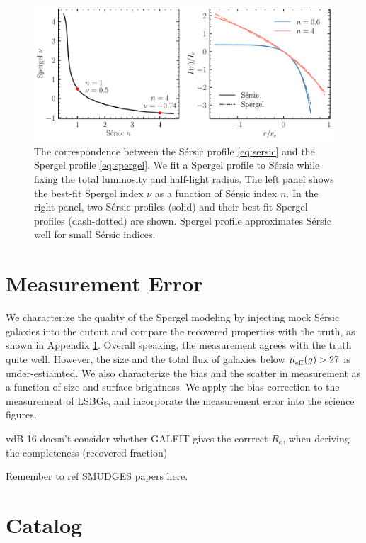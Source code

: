 \documentclass[twocolumn,astrosymb,twocolappendix]{aastex631}
\newcommand{\sersic}{S\'ersic}
\begin{document}
\begin{CJK*}{UTF8}{gbsn}
\begin{figure}
	\vbox{ 
		\centering
		\includegraphics[width=0.75\linewidth]{spergel_sersic_calib.pdf}
	}
    \caption{The correspondence between the \sersic{} profile \eqref{eq:sersic} and the Spergel profile \eqref{eq:spergel}. We fit a Spergel profile to \sersic{} while fixing the total luminosity and half-light radius. The left panel shows the best-fit Spergel index $\nu$ as a function of \sersic{} index $n$. In the right panel, two \sersic{} profiles (solid) and their best-fit Spergel profiles (dash-dotted) are shown. Spergel profile approximates \sersic{} well for small \sersic{} indices.  
    }
    \label{fig:spgl_calib}
\end{figure}


\section{Measurement Error}\label{ap:meas_error}

We characterize the quality of the Spergel modeling by injecting mock \sersic{} galaxies into the cutout and compare the recovered properties with the truth, as shown in Appendix \ref{ap:meas_error}. Overall speaking, the measurement agrees with the truth quite well. However, the size and the total flux of galaxies below $\overline{\mu}_{\rm eff} (g) > 27$ is under-estiamted. We also characterize the bias and the scatter in measurement as a function of size and surface brightness. We apply the bias correction to the measurement of LSBGs, and incorporate the measurement error into the science figures. 



vdB 16 doesn't consider whether GALFIT gives the corrrect $R_e$, when deriving the completeness (recovered fraction)

Remember to ref SMUDGES papers here.


\section{Catalog}
\onecolumngrid 


\end{CJK*}
\end{document}
